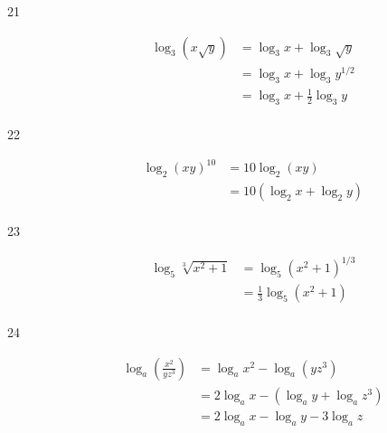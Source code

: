 \documentclass{exam}
\begin{document}
\begin{description}
      \item[21] 
        \begin{align*}
          \log_3 \left( x \sqrt{y} \right) &= \log_3 x + \log_3 \sqrt{y} \\
                                           &= \log_3 x + \log_3 y^{1/2} \\
                                           &= \boxed{\log_3 x + \frac{1}{2} \log_3 y} \\
        \end{align*}

      \item[22] 
        \begin{align*}
          \log_2 (xy)^{10} &= 10 \log_2 (xy) \\
                           &= \boxed{10 (\log_2 x + \log_2 y)} \\
        \end{align*}

      \item[23] 
        \begin{align*}
          \log_5 \sqrt[3]{x^2 + 1} &= \log_5 \left( x^2 + 1 \right)^{1/3} \\
                                   &= \boxed{\frac{1}{3} \log_5 \left( x^2 + 1 \right)} \\
        \end{align*}

      \item[24] 
        \begin{align*}
          \log_a \left( \frac{x^2}{yz^3} \right) &= \log_a x^2 - \log_a \left( yz^3 \right) \\
                                                 &= 2 \log_a x - \left( \log_a y + \log_a z^3 \right) \\
                                                 &= \boxed{2 \log_a x - \log_a y - 3 \log_a z} \\
        \end{align*}



\end{description}
\end{document}
